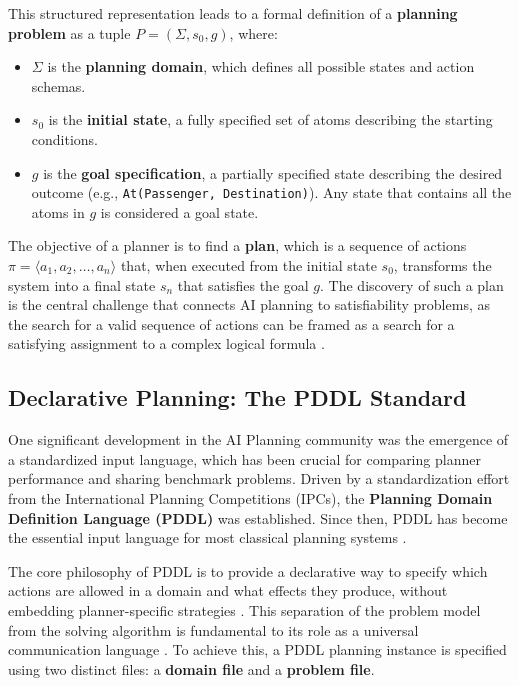 \documentclass[12pt, a4paper, oneside]{report} %
\begin{document}
This structured representation leads to a formal definition of a \textbf{planning problem} as a tuple $P = (\Sigma, s_0, g)$, where:
\begin{itemize}
    \item \textbf{$\Sigma$} is the \textbf{planning domain}, which defines all possible states and action schemas.
    \item \textbf{$s_0$} is the \textbf{initial state}, a fully specified set of atoms describing the starting conditions.
    \item \textbf{$g$} is the \textbf{goal specification}, a partially specified state describing the desired outcome (e.g., \texttt{At(Passenger, Destination)}). Any state that contains all the atoms in $g$ is considered a goal state.
\end{itemize}

The objective of a planner is to find a \textbf{plan}, which is a sequence of actions $\pi = \langle a_1, a_2, \dots, a_n \rangle$ that, when executed from the initial state $s_0$, transforms the system into a final state $s_n$ that satisfies the goal $g$. The discovery of such a plan is the central challenge that connects AI planning to satisfiability problems, as the search for a valid sequence of actions can be framed as a search for a satisfying assignment to a complex logical formula \cite{Nareyek2005}.
\subsection{Declarative Planning: The PDDL Standard}
\label{sec:pddl_standard}

One significant development in the AI Planning community was the emergence of a standardized input language, which has been crucial for comparing planner performance and sharing benchmark problems. Driven by a standardization effort from the International Planning Competitions (IPCs), the \textbf{Planning Domain Definition Language (PDDL)} was established. Since then, PDDL has become the essential input language for most classical planning systems \cite{roberts2009learning, mccluskey2003pddl}.

The core philosophy of PDDL is to provide a declarative way to specify which actions are allowed in a domain and what effects they produce, without embedding planner-specific strategies \cite{mcdermott1998pddl}. This separation of the problem model from the solving algorithm is fundamental to its role as a universal communication language \cite{mccluskey2003pddl}. To achieve this, a PDDL planning instance is specified using two distinct files: a \textbf{domain file} and a \textbf{problem file}.
\end{document}
